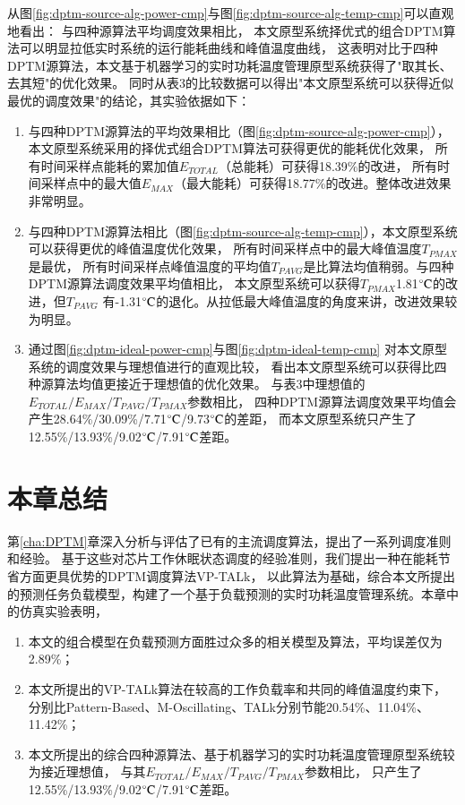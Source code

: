 从图\ref{fig:dptm-source-alg-power-cmp}与图\ref{fig:dptm-source-alg-temp-cmp}可以直观地看出： 与四种源算法平均调度效果相比， 本文原型系统择优式的组合DPTM算法可以明显拉低实时系统的运行能耗曲线和峰值温度曲线， 这表明对比于四种DPTM源算法，本文基于机器学习的实时功耗温度管理原型系统获得了"取其长、去其短"的优化效果。 同时从表3的比较数据可以得出"本文原型系统可以获得近似最优的调度效果"的结论，其实验依据如下：
\begin{enumerate}[1)]
\item 与四种DPTM源算法的平均效果相比（图\ref{fig:dptm-source-alg-power-cmp}）， 本文原型系统采用的择优式组合DPTM算法可获得更优的能耗优化效果， 所有时间采样点能耗的累加值$E_{TOTAL}$（总能耗）可获得18.39\%的改进， 所有时间采样点中的最大值$E_{MAX}$（最大能耗）可获得18.77\%的改进。整体改进效果非常明显。
\item 与四种DPTM源算法相比（图\ref{fig:dptm-source-alg-temp-cmp}），本文原型系统可以获得更优的峰值温度优化效果， 所有时间采样点中的最大峰值温度$T_{PMAX}$是最优， 所有时间采样点峰值温度的平均值$T_{PAVG}$是比算法均值稍弱。与四种DPTM源算法调度效果平均值相比， 本文原型系统可以获得$T_{PMAX}$1.81$\celsius$的改进，但$T_{PAVG}$ 有-1.31$\celsius$的退化。从拉低最大峰值温度的角度来讲，改进效果较为明显。
\item 通过图\ref{fig:dptm-ideal-power-cmp}与图\ref{fig:dptm-ideal-temp-cmp} 对本文原型系统的调度效果与理想值进行的直观比较， 看出本文原型系统可以获得比四种源算法均值更接近于理想值的优化效果。 与表3中理想值的$E_{TOTAL}/E_{MAX}/T_{PAVG}/T_{PMAX}$参数相比， 四种DPTM源算法调度效果平均值会产生28.64\%/30.09\%/7.71$\celsius$/9.73$\celsius$的差距， 而本文原型系统只产生了12.55\%/13.93\%/9.02$\celsius$/7.91$\celsius$差距。
\end{enumerate}

\section{本章总结}
第\ref{cha:DPTM}章深入分析与评估了已有的主流调度算法，提出了一系列调度准则和经验。 基于这些对芯片工作休眠状态调度的经验准则，我们提出一种在能耗节省方面更具优势的DPTM调度算法VP-TALk， 以此算法为基础，综合本文所提出的预测任务负载模型，构建了一个基于负载预测的实时功耗温度管理系统。本章中的仿真实验表明，
\begin{enumerate}[1)]
\item 本文的组合模型在负载预测方面胜过众多的相关模型及算法，平均误差仅为2.89\%；
\item 本文所提出的VP-TALk算法在较高的工作负载率和共同的峰值温度约束下， 分别比Pattern-Based、M-Oscillating、TALk分别节能20.54\%、11.04\%、11.42\%；
\item 本文所提出的综合四种源算法、基于机器学习的实时功耗温度管理原型系统较为接近理想值， 与其$E_{TOTAL}/E_{MAX}/T_{PAVG}/T_{PMAX}$参数相比， 只产生了12.55\%/13.93\%/9.02$\celsius$/7.91$\celsius$差距。
\end{enumerate}
